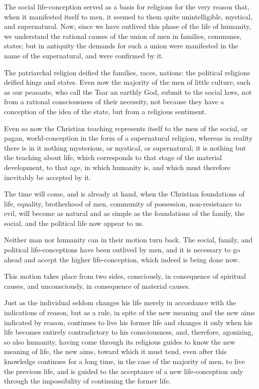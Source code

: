 \documentclass{book}
\begin{document}
The social life-conception served as a basis for religions for the very reason that, when it manifested itself to men, it seemed to them quite unintelligible, mystical, and supernatural. Now, since we have outlived this phase of the life of humanity, we understand the rational causes of the union of men in families, communes, states; but in antiquity the demands for such a union were manifested in the name of the supernatural, and were confirmed by it.

The patriarchal religion deified the families, races, nations: the political religions deified kings and states. Even now the majority of the men of little culture, such as our peasants, who call the Tsar an earthly God, submit to the social laws, not from a rational consciousness of their necessity, not because they have a conception of the idea of the state, but from a religious sentiment.

Even so now the Christian teaching represents itself to the men of the social, or pagan, world-conception in the form of a supernatural religion, whereas in reality there is in it nothing mysterious, or mystical, or supernatural; it is nothing but the teaching about life, which corresponds to that stage of the material development, to that age, in which humanity is, and which must therefore inevitably be accepted by it.

The time will come, and is already at hand, when the Christian foundations of life, equality, brotherhood of men, community of possession, non-resistance to evil, will become as natural and as simple as the foundations of the family, the social, and the political life now appear to us.

Neither man nor humanity can in their motion turn back. The social, family, and political life-conceptions have been outlived by men, and it is necessary to go ahead and accept the higher life-conception, which indeed is being done now.

This motion takes place from two sides, consciously, in consequence of spiritual causes, and unconsciously, in consequence of material causes.

Just as the individual seldom changes his life merely in accordance with the indications of reason, but as a rule, in spite of the new meaning and the new aims indicated by reason, continues to live his former life and changes it only when his life becomes entirely contradictory to his consciousness, and, therefore, agonizing, so also humanity, having come through its religious guides to know the new meaning of life, the new aims, toward which it must tend, even after this knowledge continues for a long time, in the case of the majority of men, to live the previous life, and is guided to the acceptance of a new life-conception only through the impossibility of continuing the former life.
\end{document}
